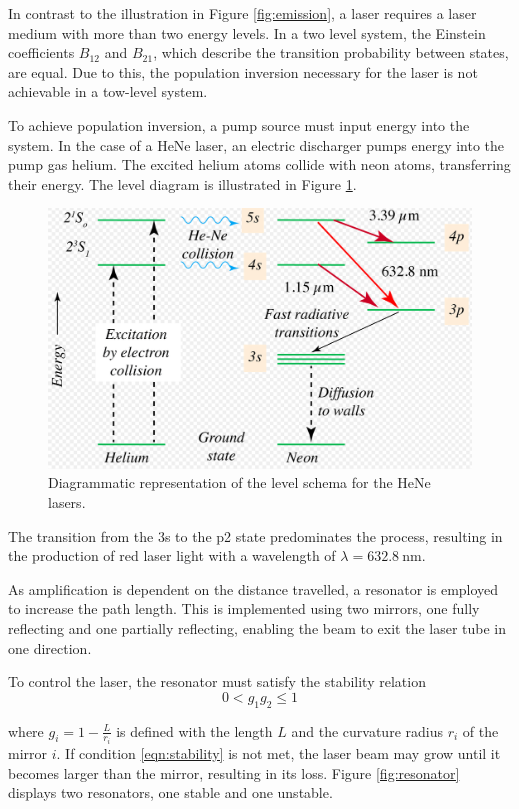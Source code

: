 \noindent
In contrast to the illustration in Figure \ref{fig:emission}, a laser 
requires a laser medium with more than two energy levels. In a two
level system, the Einstein coefficients $B_{12}$ and $B_{21}$, which 
describe the transition probability between states, are equal. Due to 
this, the population inversion necessary for the laser is not achievable
in a tow-level system.

\noindent
To achieve population inversion, a pump source must input energy
into the system. In the case of a HeNe laser, an electric discharger 
pumps energy into the pump gas helium. The excited helium atoms 
collide with neon atoms, transferring their energy. The level diagram is
illustrated in Figure \ref{fig:level}.

\begin{figure}
    \centering
    \includegraphics[width=0.7\linewidth]{pictures/level.png} %
    \caption{Diagrammatic representation of the level schema for the HeNe lasers. \cite{Wikipedia}}
    \label{fig:level}
\end{figure}
The transition from the 3s to the p2 state predominates the process, 
resulting in the production of red laser light with a wavelength of
$\lambda = \SI{632.8}{\nano\meter}$.

\noindent
As amplification is dependent on the distance travelled, a resonator is
employed to increase the path length. This is implemented using two
mirrors, one fully reflecting and one partially reflecting, enabling
the beam to exit the laser tube in one direction.

\noindent
To control the laser, the resonator must satisfy the stability relation
\begin{equation}
    0 < g_1g_2 \leq 1
    \label{eqn:stability}
\end{equation}

\noindent
where $g_i=1-\frac{L}{r_i}$ is defined with the length $L$ and the 
curvature radius $r_i$ of the mirror $i$. If condition \eqref{eqn:stability}
is not met, the laser beam may grow until it becomes larger than the mirror,
resulting in its loss. Figure \ref{fig:resonator} displays two resonators,
one stable and one unstable.

